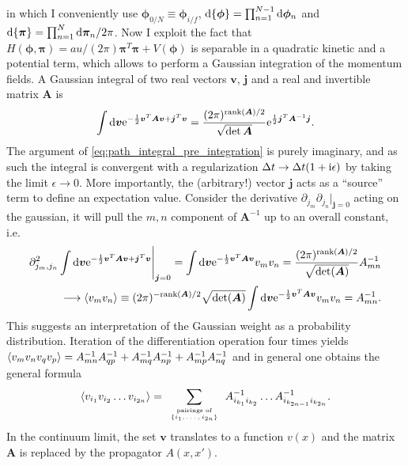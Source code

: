 in which I conveniently use $\bm\phi_{0/N}\equiv \bm\phi_{i/f}$, $\mathrm d\{\bm\phi\}=\prod_{n=1}^{N-1}\mathrm d\bm\phi_n$ and $\mathrm d\{\bm\pi\}=\prod_{n=1}^N\mathrm d\bm\pi_n/2\pi$.
Now I exploit the fact that $H(\bm\phi,\bm\pi)=au/(2\pi)\bm\pi^T\bm\pi + V(\bm\phi)$ is separable in a quadratic kinetic and a potential term, which allows to perform a Gaussian integration of the momentum fields.
A Gaussian integral of two real vectors $\bm v$, $\bm j$ and a real and invertible matrix $\bm A$ is
\begin{align}
    \int\mathrm d\bm v\mathrm e^{-\frac12\bm v^T\bm A\bm v + \bm j^T\bm v} = \frac{(2\pi)^{{\rm rank}(\bm A)/2}}{\sqrt{\det\bm A}}\mathrm e^{\frac12\bm j^T\bm A^{-1}\bm j}.
    \label{eq:multi_gaussian}
\end{align}
The argument of \cref{eq:path_integral_pre_integration} is purely imaginary, and as such the integral is convergent with a regularization $\Delta t\rightarrow\Delta t(1+\mathrm i\epsilon)$ by taking the limit $\epsilon\rightarrow0$.
More importantly, the (arbitrary!) vector $\bm j$ acts as a ``source'' term to define an expectation value.
Consider the derivative $\partial_{j_m}\partial_{j_n}|_{\bm j=0}$ acting on the gaussian, it will pull the $m,n$ component of $\bm A^{-1}$ up to an overall constant, i.e.
\begin{align}
    \partial^2_{j_m,j_n}\int\mathrm d\bm v\mathrm e^{-\frac12\bm v^T\bm A\bm v + \bm j^T \bm v}\Bigg|_{\bm j=0}
    =
    \int\mathrm d\bm v\mathrm e^{-\frac12\bm v^T\bm A\bm v}v_mv_n
    =
    \frac{(2\pi)^{{\rm rank}(\bm A)/2}}{\sqrt{\det(\bm A)}}A^{-1}_{mn}
    \\
    \longrightarrow \braket{v_mv_n}\equiv (2\pi)^{-{\rm rank}(\bm A)/2}\sqrt{\det(\bm A)}\int\mathrm d\bm v\mathrm e^{-\frac12\bm v^T\bm A\bm v}v_mv_n = A_{mn}^{-1}.
    \label{eq:multi_source}
\end{align}
This suggests an interpretation of the Gaussian weight as a probability distribution.
Iteration of the differentiation operation four times yields $\braket{v_mv_nv_qv_p}=A^{-1}_{mn}A^{-1}_{qp}+A^{-1}_{mq}A^{-1}_{np}+A^{-1}_{mp}A^{-1}_{nq}$ and in general one obtains the general formula
\begin{align}
    \braket{v_{i_1}v_{i_2}\dots v_{i_{2n}}} =
    \sum_{\tiny\begin{array}{c}\text{pairings of}\\ \{i_1,\dots,i_{2n}\}\end{array}}
    A^{-1}_{i_{k_1}i_{k_2}}\dots A^{-1}_{i_{k_{2n-1}}i_{k_{2n}}}.
\end{align}
In the continuum limit, the set $\bm v$ translates to a function $v(x)$ and the matrix $\bm A$ is replaced by the propagator $A(x,x')$.
